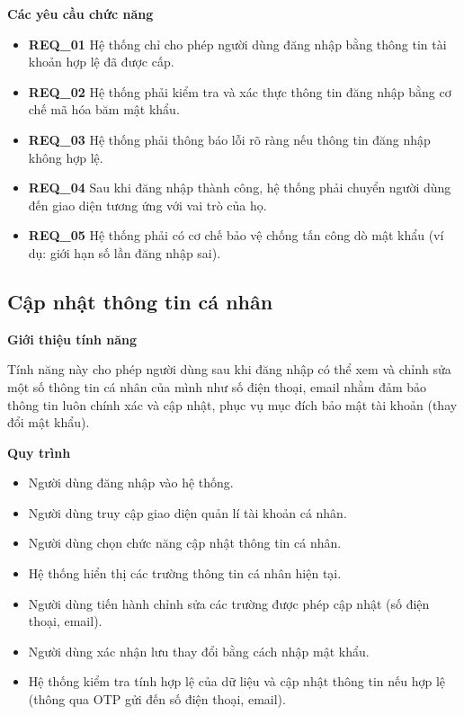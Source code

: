 \noindent \textbf{Các yêu cầu chức năng}

\begin{itemize}

    \item \textbf{REQ\_01} Hệ thống chỉ cho phép người dùng đăng nhập bằng thông tin tài khoản hợp lệ đã được cấp.

    \item \textbf{REQ\_02} Hệ thống phải kiểm tra và xác thực thông tin đăng nhập bằng cơ chế mã hóa băm mật khẩu.

    \item \textbf{REQ\_03} Hệ thống phải thông báo lỗi rõ ràng nếu thông tin đăng nhập không hợp lệ.

    \item \textbf{REQ\_04} Sau khi đăng nhập thành công, hệ thống phải chuyển người dùng đến giao diện tương ứng với vai trò của họ.

    \item \textbf{REQ\_05} Hệ thống phải có cơ chế bảo vệ chống tấn công dò mật khẩu (ví dụ: giới hạn số lần đăng nhập sai).

\end{itemize}

\subsection{Cập nhật thông tin cá nhân}

\noindent \textbf{Giới thiệu tính năng}

Tính năng này cho phép người dùng sau khi đăng nhập có thể xem và chỉnh sửa một số thông tin cá nhân của mình như số điện thoại, email nhằm đảm bảo thông tin luôn chính xác và cập nhật, phục vụ mục đích bảo mật tài khoản (thay đổi mật khẩu).

\noindent \textbf{Quy trình}

\begin{itemize}

\item Người dùng đăng nhập vào hệ thống.

\item Người dùng truy cập giao diện quản lí tài khoản cá nhân.

\item Người dùng chọn chức năng cập nhật thông tin cá nhân.

\item Hệ thống hiển thị các trường thông tin cá nhân hiện tại.

\item Người dùng tiến hành chỉnh sửa các trường được phép cập nhật (số điện thoại, email).

\item Người dùng xác nhận lưu thay đổi bằng cách nhập mật khẩu.

\item Hệ thống kiểm tra tính hợp lệ của dữ liệu và cập nhật thông tin nếu hợp lệ (thông qua OTP gửi đến số điện thoại, email).

\end{itemize}


